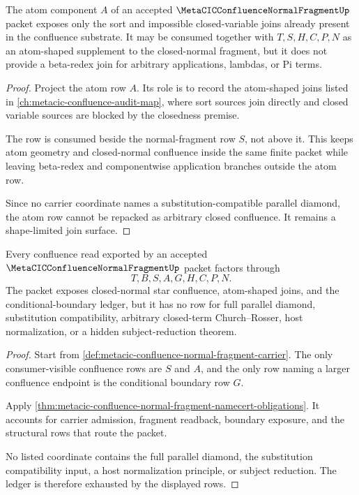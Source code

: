 \begin{theorem}
\label{thm:metacic-confluence-normal-fragment-atom-join-scope}
The atom component $A$ of an accepted
$\MetaCICConfluenceNormalFragmentUp$ packet exposes only the sort and
impossible closed-variable joins already present in the confluence substrate.
It may be consumed together with $T,S,H,C,P,N$ as an atom-shaped supplement to
the closed-normal fragment, but it does not provide a beta-redex join for
arbitrary applications, lambdas, or Pi terms.
\end{theorem}
\begin{proof}
Project the atom row $A$. Its role is to record the atom-shaped joins listed in
\autoref{ch:metacic-confluence-audit-map}, where sort sources join directly and
closed variable sources are blocked by the closedness premise.

The row is consumed beside the normal-fragment row $S$, not above it. This keeps
atom geometry and closed-normal confluence inside the same finite packet while
leaving beta-redex and componentwise application branches outside the atom row.

Since no carrier coordinate names a substitution-compatible parallel diamond,
the atom row cannot be repacked as arbitrary closed confluence. It remains a
shape-limited join surface.
\end{proof}

\begin{theorem}
\label{thm:metacic-confluence-normal-fragment-ledger-boundary}
Every confluence read exported by an accepted
$\MetaCICConfluenceNormalFragmentUp$ packet factors through
$$
T,B,S,A,G,H,C,P,N.
$$
The packet exposes closed-normal star confluence, atom-shaped joins, and the
conditional-boundary ledger, but it has no row for full parallel diamond,
substitution compatibility, arbitrary closed-term Church--Rosser, host
normalization, or a hidden subject-reduction theorem.
\end{theorem}
\begin{proof}
Start from \autoref{def:metacic-confluence-normal-fragment-carrier}. The only
consumer-visible confluence rows are $S$ and $A$, and the only row naming a
larger confluence endpoint is the conditional boundary row $G$.

Apply \autoref{thm:metacic-confluence-normal-fragment-namecert-obligations}.
It accounts for carrier admission, fragment readback, boundary exposure, and
the structural rows that route the packet.

No listed coordinate contains the full parallel diamond, the substitution
compatibility input, a host normalization principle, or subject reduction. The
ledger is therefore exhausted by the displayed rows.
\end{proof}

